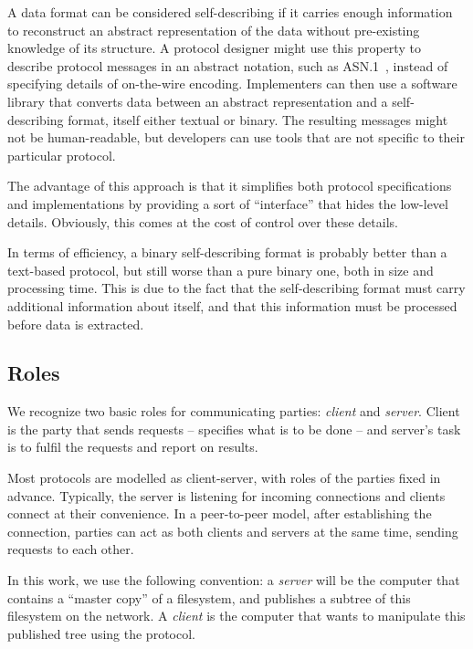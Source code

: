 A data format can be considered self-describing if it carries enough information to reconstruct an abstract
representation of the data without pre-existing knowledge of its structure. A protocol designer might use this
property to describe protocol messages in an abstract notation, such as ASN.1~\cite{asn-basic}, instead of
specifying details of on-the-wire encoding. Implementers can then use a software library that converts data
between an abstract representation and a self-describing format, itself either textual or binary. The
resulting messages might not be human-readable, but developers can use tools that are not specific to their
particular protocol.

The advantage of this approach is that it simplifies both protocol specifications and implementations by
providing a sort of ``interface'' that hides the low-level details. Obviously, this comes at the cost of
control over these details.

In terms of efficiency, a binary self-describing format is probably better than a text-based protocol, but
still worse than a pure binary one, both in size and processing time. This is due to the fact that the
self-describing format must carry additional information about itself, and that this information must be
processed before data is extracted.

\subsection{Roles}

We recognize two basic roles for communicating parties: {\it client} and {\it server}. Client is the party
that sends requests -- specifies what is to be done -- and server's task is to fulfil the requests and report on
results.

Most protocols are modelled as client-server, with roles of the parties fixed in advance. Typically, the
server is listening for incoming connections and clients connect at their convenience. In a peer-to-peer
model, after establishing the connection, parties can act as both clients and servers at the same time,
sending requests to each other.

In this work, we use the following convention: a {\it server} will be the computer that contains a ``master
copy'' of a filesystem, and publishes a subtree of this filesystem on the network. A {\it client} is the
computer that wants to manipulate this published tree using the protocol.



